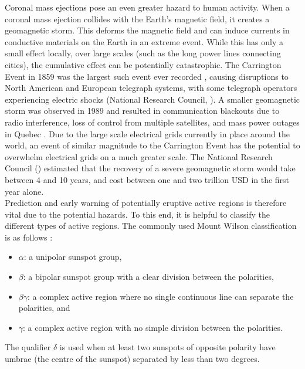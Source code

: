 \documentclass[11pt,a4paper,onecolumn]{report}
\begin{document}
Coronal mass ejections pose an even greater hazard to human activity. When a
coronal mass ejection collides with the Earth's magnetic field, it creates a
geomagnetic storm. This deforms the magnetic field and can induce currents in
conductive materials on the Earth in an extreme event. While this has only a
small effect locally, over large scales (such as the long power lines connecting cities), the
cumulative effect can be potentially catastrophic. The Carrington Event in 1859
\citep{carrington_description_1859, hodgson_curious_1859} was the largest such
event ever recorded \citep{cliver_1859_2004}, causing disruptions to North
American and European telegraph systems, with some telegraph operators
experiencing electric shocks (National Research Council,
\citeyear{council_severe_2008}). A smaller geomagnetic storm was observed in
1989 and resulted in communication blackouts due to radio interference, loss of
control from multiple satellites, and mass power outages in Quebec
\citep{odenwald_day_2015}. Due to the large scale electrical grids currently in
place around the world, an event of similar magnitude to the Carrington Event
has the potential to overwhelm electrical grids on a much greater scale. The
National Research Council (\citeyear{council_severe_2008}) estimated that the
recovery of a severe geomagnetic storm would take between 4 and 10 years, and
cost between one and two trillion USD in the first year alone. \\


Prediction and early warning of potentially eruptive active regions is therefore
vital due to the potential hazards. To this end, it is helpful to classify the
different types of active regions. The commonly used Mount Wilson classification
is as follows \citep{martres_etude_1966}:
\begin{itemize}
  \item \(\alpha\): a unipolar sunspot group,
  \item \(\beta\): a bipolar sunspot group with a clear division between the polarities,
  \item \(\beta \gamma\): a complex active region where no single continuous
  line can separate the polarities, and
  \item \(\gamma\): a complex active region with no simple division between the polarities.
\end{itemize}
The qualifier \(\delta\) is used when at least two sunspots of
opposite polarity have umbrae (the centre of the sunspot) separated by less than
two degrees. \\
\end{document}
